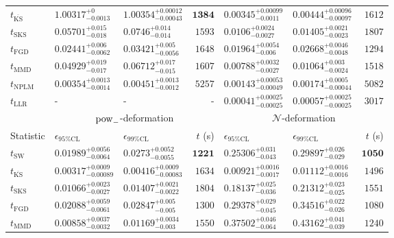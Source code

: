 \begin{tabular}{l|llr|llr}
	$t_{\overline{\mathrm{KS}}}$ & $1.00317_{-0.0013}^{+0}$ & $1.00354_{-0.00043}^{+0.00012}$ & ${\mathbf{1384}}$ & ${\mathbf{0.00345_{-0.0011}^{+0.00099}}}$ & ${\mathbf{0.00444_{-0.00097}^{+0.00096}}}$ & $1612$ \\
	$t_{\mathrm{SKS}}$ & $0.05701_{-0.018}^{+0.015}$ & $0.0746_{-0.014}^{+0.014}$ & $1593$ & $0.0106_{-0.0027}^{+0.0024}$ & $0.01405_{-0.0023}^{+0.0021}$ & $1807$ \\
	$t_{\mathrm{FGD}}$ & ${\mathbf{0.02441_{-0.0062}^{+0.006}}}$ & ${\mathbf{0.03421_{-0.0056}^{+0.005}}}$ & $1648$ & $0.01964_{-0.006}^{+0.0054}$ & $0.02668_{-0.0048}^{+0.0046}$ & $1294$ \\
	$t_{\mathrm{MMD}}$ & $0.04929_{-0.017}^{+0.019}$ & $0.06712_{-0.015}^{+0.017}$ & $1607$ & $0.00788_{-0.0027}^{+0.0032}$ & $0.01064_{-0.0024}^{+0.003}$ & $1518$ \\
\rowcolor{red!35}	$t_{\mathrm{NPLM}}$ & $0.00354_{-0.0014}^{+0.0013}$ & $0.00451_{-0.0012}^{+0.0013}$ & $5257$ & $0.00143_{-0.00049}^{+0.00053}$ & $0.00174_{-0.00044}^{+0.0005}$ & $5082$ \\
	$t_{\mathrm{LLR}}$ & - & - & - & $0.00041_{-0.00025}^{+0.00025}$ & $0.00057_{-0.00025}^{+0.00025}$ & $3017$ \\
	\toprule
	\multicolumn{1}{c}{} & \multicolumn{3}{c}{$\rm{pow}_{-}$-deformation} & \multicolumn{3}{c}{$\mathcal{N}$-deformation} \\
	Statistic & $\epsilon_{95\%\mathrm{CL}}$ & $\epsilon_{99\%\mathrm{CL}}$ & $t$ (s) & $\epsilon_{95\%\mathrm{CL}}$ & $\epsilon_{99\%\mathrm{CL}}$ & $t$ (s) \\
	\midrule
	$t_{\mathrm{SW}}$ & $0.01989_{-0.0064}^{+0.0056}$ & $0.0273_{-0.0055}^{+0.0052}$ & ${\mathbf{1221}}$ & $0.25306_{-0.043}^{+0.031}$ & $0.29897_{-0.029}^{+0.026}$ & ${\mathbf{1050}}$ \\
	$t_{\overline{\mathrm{KS}}}$ & ${\mathbf{0.00317_{-0.00089}^{+0.0009}}}$ & ${\mathbf{0.00416_{-0.00083}^{+0.0009}}}$ & $1634$ & ${\mathbf{0.00921_{-0.0017}^{+0.0016}}}$ & ${\mathbf{0.01112_{-0.0016}^{+0.0016}}}$ & $1496$ \\
	$t_{\mathrm{SKS}}$ & $0.01066_{-0.0027}^{+0.0023}$ & $0.01407_{-0.0022}^{+0.0021}$ & $1804$ & $0.18137_{-0.036}^{+0.025}$ & $0.21312_{-0.025}^{+0.023}$ & $1551$ \\
	$t_{\mathrm{FGD}}$ & $0.02088_{-0.0061}^{+0.0059}$ & $0.02847_{-0.005}^{+0.005}$ & $1300$ & $0.29378_{-0.045}^{+0.029}$ & $0.34516_{-0.026}^{+0.022}$ & $1080$ \\
	$t_{\mathrm{MMD}}$ & $0.00858_{-0.0032}^{+0.0037}$ & $0.01169_{-0.003}^{+0.0034}$ & $1550$ & $0.37502_{-0.064}^{+0.046}$ & $0.43162_{-0.039}^{+0.041}$ & $1240$ \\

\end{tabular}

